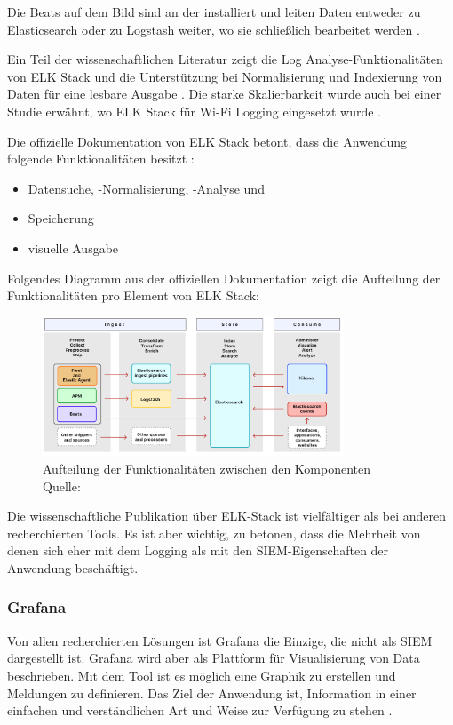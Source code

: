 Die Beats auf dem Bild sind an der  installiert und leiten Daten entweder zu Elasticsearch oder zu Logstash weiter, wo sie schließlich bearbeitet werden \citep{Jain_LMELK}. 

Ein Teil der wissenschaftlichen Literatur zeigt die Log Analyse-Funktionalitäten von ELK Stack und die Unterstützung bei Normalisierung und Indexierung von Daten für eine lesbare Ausgabe \citep{Advani_elkstakc}. Die starke Skalierbarkeit wurde auch bei einer Studie erwähnt, wo ELK Stack für Wi-Fi Logging eingesetzt wurde \citep{Wang_elkwifi}. 

Die offizielle Dokumentation von ELK Stack betont, dass die Anwendung folgende Funktionalitäten besitzt \citep{elastic_docs}: 

\begin{itemize}[noitemsep]
   \item Datensuche, -Normalisierung, -Analyse und 
   \item Speicherung
   \item visuelle Ausgabe
\end{itemize}

Folgendes Diagramm aus der offiziellen Dokumentation zeigt die Aufteilung der Funktionalitäten pro Element von ELK Stack:

\begin{figure}[H]
   \centering
   \includegraphics[width=0.8\textwidth]{assets/2_p9.png}
   \caption[Aufteilung der Funktionalitäten zwischen den Komponenten]
   {Aufteilung der Funktionalitäten zwischen den Komponenten\\Quelle: \citep{elastic_docs}}
   \centering
\end{figure}

Die wissenschaftliche Publikation über ELK-Stack ist vielfältiger als bei anderen recherchierten Tools. Es ist aber wichtig, zu betonen, dass die Mehrheit von denen sich eher mit dem Logging als mit den \gls{SIEM}-Eigenschaften der Anwendung beschäftigt.

\subsubsection{Grafana}
Von allen recherchierten Lösungen ist Grafana die Einzige, die nicht als \gls{SIEM} dargestellt ist. Grafana wird aber als Plattform für Visualisierung von Data beschrieben. Mit dem Tool ist es möglich eine Graphik zu erstellen und Meldungen zu definieren. Das Ziel der Anwendung ist, Information in einer einfachen und verständlichen Art und Weise zur Verfügung zu stehen \citep{redhat_grafana}.  

